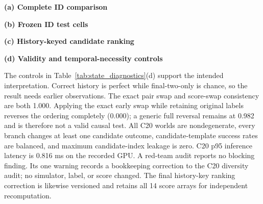 \documentclass[letterpaper,10pt,conference]{ieeeconf}
\begin{document}
\begin{table}[t]
    \centering
    \begin{minipage}[t]{0.53\textwidth}
        \centering
        \textbf{(a) Complete ID comparison}\par\smallskip
        \resizebox{\linewidth}{!}{}
    \end{minipage}\hfill
    \begin{minipage}[t]{0.44\textwidth}
        \centering
        \textbf{(b) Frozen ID test cells}\par\smallskip
        \resizebox{\linewidth}{!}{}
        \vspace{1.0em}

        \textbf{(c) History-keyed candidate ranking}\par\smallskip
        \resizebox{\linewidth}{!}{}
        \vspace{1.0em}

        \textbf{(d) Validity and temporal-necessity controls}\par\smallskip
        \resizebox{0.78\linewidth}{!}{}
    \end{minipage}
    \caption{State diagnostics. Parenthetical counts in (a) are seeds.
    Cell-wise analytic rules in (b) are strongest-in-cell stress controls, not
    test-selected deployable models. ``Mixed'' in (c) is the fraction of
    history contexts containing both outcomes. Panel (d) reports final audit
    gates.}
    \label{tab:state_diagnostics}
\end{table}

The controls in Table~\ref{tab:state_diagnostics}(d) support the intended interpretation.
Correct history is perfect while final-two-only is chance, so the result needs
earlier observations. The exact pair swap and score-swap consistency are both
1.000. Applying the exact early swap while retaining original labels reverses
the ordering completely (0.000); a generic full reversal remains at 0.982 and
is therefore not a valid causal test. All C20 worlds are nondegenerate, every branch changes at least one
candidate outcome, candidate-template success rates are balanced, and maximum
candidate-index leakage is zero. C20 p95 inference latency is 0.816 ms on the
recorded GPU. A red-team audit reports no blocking finding. Its one warning
records a bookkeeping correction to the C20 diversity audit; no simulator,
label, or score changed. The final history-key ranking correction is likewise
versioned and retains all 14 score arrays for independent recomputation.
\end{document}
